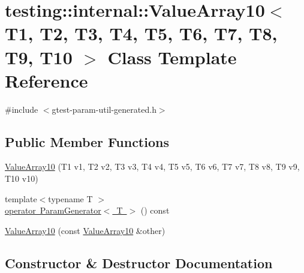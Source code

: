 \hypertarget{classtesting_1_1internal_1_1ValueArray10}{}\section{testing\+::internal\+::Value\+Array10$<$ T1, T2, T3, T4, T5, T6, T7, T8, T9, T10 $>$ Class Template Reference}
\label{classtesting_1_1internal_1_1ValueArray10}


{\ttfamily \#include $<$gtest-\/param-\/util-\/generated.\+h$>$}

\subsection*{Public Member Functions}
\begin{DoxyCompactItemize}
\item 
\mbox{\hyperlink{classtesting_1_1internal_1_1ValueArray10_a763527165bcd1d8e7c366f979b76736b}{Value\+Array10}} (T1 v1, T2 v2, T3 v3, T4 v4, T5 v5, T6 v6, T7 v7, T8 v8, T9 v9, T10 v10)
\item 
{\footnotesize template$<$typename T $>$ }\\\mbox{\hyperlink{classtesting_1_1internal_1_1ValueArray10_afa8855c713997ae82781159f3a3d53fc}{operator Param\+Generator$<$ T $>$}} () const
\item 
\mbox{\hyperlink{classtesting_1_1internal_1_1ValueArray10_a05195c20e50321e51b2502c71c5ec8fa}{Value\+Array10}} (const \mbox{\hyperlink{classtesting_1_1internal_1_1ValueArray10}{Value\+Array10}} \&other)
\end{DoxyCompactItemize}


\subsection{Constructor \& Destructor Documentation}
\mbox{\label{classtesting_1_1internal_1_1ValueArray10_a763527165bcd1d8e7c366f979b76736b}} 
